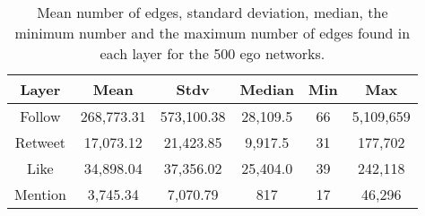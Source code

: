 \begin{table}[h!tb]
    \renewcommand{\arraystretch}{1.3}
    \caption{Mean number of edges, standard deviation, median, the minimum number and the maximum number of edges found in each layer for the 500 ego networks.}
    \label{tab:numEdges}
    \centering
    \scriptsize
    \setlength\tabcolsep{6pt} %
        \begin{tabular}{|c|c|c|c|c|c|}
        \hline
        {\bf Layer} &   {\bf Mean}  &   {\bf Stdv}  &   {\bf Median}  &   {\bf Min}  &   {\bf Max}  \\ \hline \hline
        Follow      &   268,773.31  &   573,100.38  &   28,109.5    &       66      &   5,109,659   \\  \hline
        Retweet    &   17,073.12   &   21,423.85   &   9,917.5     &       31      &   177,702     \\  \hline
        Like       &   34,898.04   &   37,356.02   &   25,404.0    &       39      &   242,118     \\  \hline
        Mention    &   3,745.34    &   7,070.79    &   817         &       17      &   46,296      \\  \hline\hline 
    \end{tabular}
\end{table}